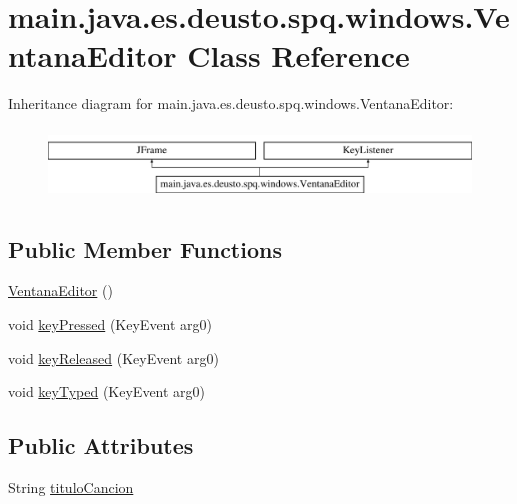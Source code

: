 \hypertarget{classmain_1_1java_1_1es_1_1deusto_1_1spq_1_1windows_1_1_ventana_editor}{}\section{main.\+java.\+es.\+deusto.\+spq.\+windows.\+Ventana\+Editor Class Reference}
\label{classmain_1_1java_1_1es_1_1deusto_1_1spq_1_1windows_1_1_ventana_editor}
Inheritance diagram for main.\+java.\+es.\+deusto.\+spq.\+windows.\+Ventana\+Editor\+:\begin{figure}[H]
\begin{center}
\leavevmode
\includegraphics[height=1.924399cm]{classmain_1_1java_1_1es_1_1deusto_1_1spq_1_1windows_1_1_ventana_editor}
\end{center}
\end{figure}
\subsection*{Public Member Functions}
\begin{DoxyCompactItemize}
\item 
\hyperlink{classmain_1_1java_1_1es_1_1deusto_1_1spq_1_1windows_1_1_ventana_editor_a8ddc1e3afda659e6d75f67cdd98d4551}{Ventana\+Editor} ()
\item 
void \hyperlink{classmain_1_1java_1_1es_1_1deusto_1_1spq_1_1windows_1_1_ventana_editor_a8c78e9eb7e62561cc8c5da3343c1fd08}{key\+Pressed} (Key\+Event arg0)
\item 
void \hyperlink{classmain_1_1java_1_1es_1_1deusto_1_1spq_1_1windows_1_1_ventana_editor_adef802086413f3de89885fb6ce759b55}{key\+Released} (Key\+Event arg0)
\item 
void \hyperlink{classmain_1_1java_1_1es_1_1deusto_1_1spq_1_1windows_1_1_ventana_editor_a215e84672781d3acdcb116773375dbf7}{key\+Typed} (Key\+Event arg0)
\end{DoxyCompactItemize}
\subsection*{Public Attributes}
\begin{DoxyCompactItemize}
\item 
String \hyperlink{classmain_1_1java_1_1es_1_1deusto_1_1spq_1_1windows_1_1_ventana_editor_af24a9643b65eae249994f5859e2a3b94}{titulo\+Cancion}
\end{DoxyCompactItemize}
